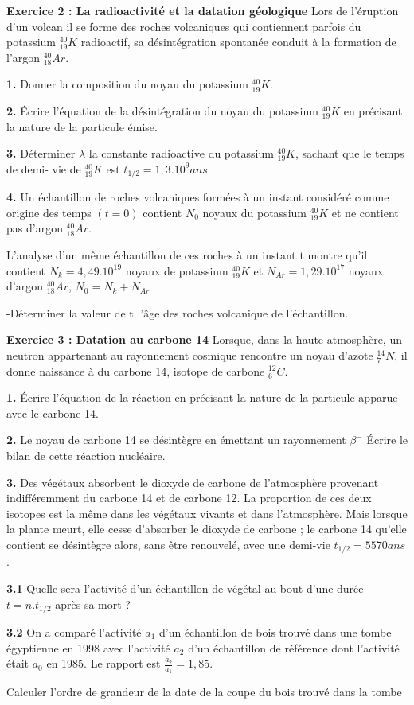 \documentclass[12pt, french]{article}
\begin{document}
\begin{Box2}{\textbf{Exercice 2 : La radioactivité et la datation géologique}}
Lors de l’éruption d’un volcan il se forme des roches volcaniques qui contiennent parfois du potassium   $_{19}^{40}K$ radioactif, sa désintégration spontanée conduit à la formation de l’argon $_{18}^{40}Ar$.

\textbf{1. }Donner la composition du noyau du potassium $_{19}^{40}K$.

\textbf{2. }Écrire l’équation de la désintégration du noyau du potassium $_{19}^{40}K$ en précisant la nature de la particule émise.

\textbf{3. } Déterminer $\lambda$ la constante radioactive du potassium $_{19}^{40}K$, sachant que le temps de demi- vie de $_{19}^{40}K$ est $t_{1/2}=1,3.10^{9}ans$

\textbf{4. } Un échantillon de roches volcaniques formées à un instant considéré comme origine des temps $(t=0)$ contient $N_0$ noyaux du potassium $_{19}^{40}K$ et ne contient pas d’argon $_{18}^{40}Ar$.

L’analyse d’un même échantillon de ces roches à un instant t montre qu’il contient $N_k = 4,49.10^{19}$ noyaux de potassium $_{19}^{40}K$  et $N_{Ar} = 1,29.10^{17}$ noyaux d’argon $_{18}^{40}Ar$, $N_0=N_k + N_{Ar}$

-Déterminer la valeur de t l’âge des roches volcanique de l’échantillon.
\end{Box2}

\begin{Box2}{\textbf{Exercice 3 : Datation au carbone 14 }}
Lorsque, dans la haute atmosphère, un neutron appartenant au rayonnement cosmique rencontre
un noyau d’azote $^{14}_7N$, il donne naissance à du carbone 14, isotope de carbone $^{12}_6C$.

\textbf{1. }Écrire l’équation de la réaction en précisant la nature de la particule apparue avec le carbone 14.

\textbf{2. }Le noyau de carbone 14 se désintègre en émettant un rayonnement $\beta^-$ Écrire le bilan de cette réaction nucléaire.

\textbf{3. }Des végétaux absorbent le dioxyde de carbone de l’atmosphère provenant indifféremment du
carbone 14 et de carbone 12. La proportion de ces deux isotopes est la même dans les végétaux vivants
et dans l’atmosphère. Mais lorsque la plante meurt, elle cesse d’absorber le dioxyde de carbone ; le
carbone 14 qu’elle contient se désintègre alors, sans être renouvelé, avec une demi-vie $t_{1/2} = 5570ans$.

\textbf{3.1 } Quelle sera l’activité d’un échantillon de végétal au bout d’une durée $t = n.t_{1/2}$ après sa mort ?

\textbf{3.2 } On a comparé l’activité $a_1$ d’un échantillon de bois trouvé dans une tombe égyptienne en 1998 avec l’activité $a_2$ d’un échantillon de référence dont l’activité était $a_0$ en 1985. Le rapport est $\frac{a_2}{a_1} = 1,85$.

Calculer l’ordre de grandeur de la date de la coupe du bois trouvé dans la tombe
\end{Box2}
\end{document}
